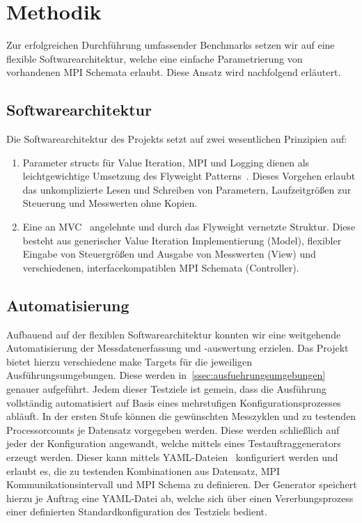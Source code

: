\section{Methodik}
\label{sec:methodik}

Zur erfolgreichen Durchführung umfassender Benchmarks setzen wir auf eine flexible Softwarearchitektur, welche eine einfache Parametrierung von vorhandenen MPI Schemata erlaubt. Diese Ansatz wird nachfolgend erläutert.

\subsection{Softwarearchitektur}
Die Softwarearchitektur des Projekts setzt auf zwei wesentlichen Prinzipien auf:
\begin{enumerate}
    \item Parameter structs für Value Iteration, MPI und Logging dienen als leichtgewichtige Umsetzung des Flyweight Patterns~\citep[S.195ff.]{gamma1995design}. Dieses Vorgehen erlaubt das unkomplizierte Lesen und Schreiben von Parametern, Laufzeitgrößen zur Steuerung und Messwerten ohne Kopien.
    \item Eine an MVC~\citep[S.125ff.]{buschmann1996pattern-oriented} angelehnte und durch das Flyweight vernetzte Struktur. Diese besteht aus generischer Value Iteration Implementierung (Model), flexibler Eingabe von Steuergrößen und Ausgabe von Messwerten (View) und verschiedenen, interfacekompatiblen MPI Schemata (Controller).
\end{enumerate}

\subsection{Automatisierung}
Aufbauend auf der flexiblen Softwarearchitektur konnten wir eine weitgehende Automatisierung der Messdatenerfassung und -auswertung erzielen. Das Projekt bietet hierzu verschiedene make Targets für die jeweiligen Ausführungsumgebungen. Diese werden in~\ref{ssec:ausfuehrungsumgebungen} genauer aufgeführt. Jedem dieser Testziele ist gemein, dass die Ausführung vollständig automatisiert auf Basis eines mehrstufigen Konfigurationsprozesses abläuft. In der ersten Stufe können die gewünschten Messzyklen und zu testenden Processorcounts je Datensatz vorgegeben werden. Diese werden schließlich auf jeder der Konfiguration angewandt, welche mittels eines Testauftraggenerators erzeugt werden. Dieser kann mittels YAML-Dateien~\citep{yaml-web} konfiguriert werden und erlaubt es, die zu testenden Kombinationen aus Datensatz, MPI Kommunikationsintervall und MPI Schema zu definieren. Der Generator speichert hierzu je Auftrag eine YAML-Datei ab, welche sich über einen Vererbungsprozess einer definierten Standardkonfiguration des Testziels bedient.

